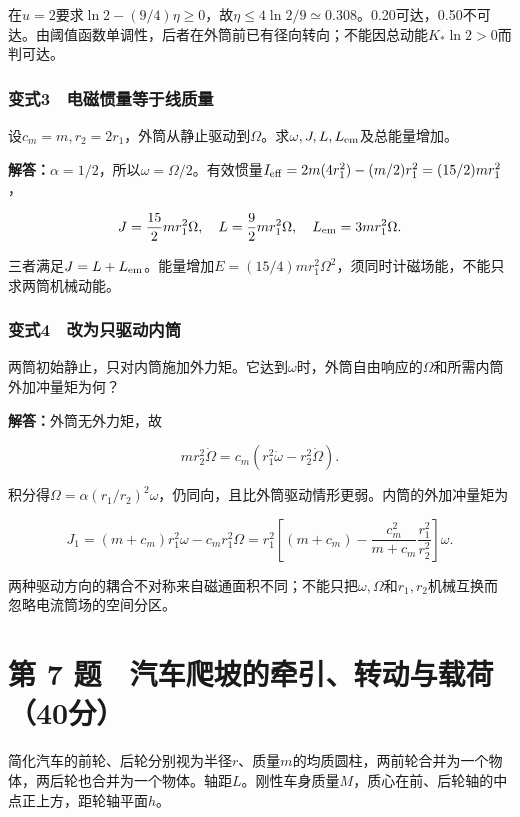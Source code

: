 \documentclass[12pt,a4paper,fontset=fandol]{ctexart}
\begin{document}
在\(u=2\)要求\(\ln2-(9/4)\eta\geq0\)，故\(\eta\leq4\ln2/9\simeq0.308\)。0.20可达，0.50不可达。由阈值函数单调性，后者在外筒前已有径向转向；不能因总动能\(K_*\ln2>0\)而判可达。

\subsubsection{变式3　电磁惯量等于线质量}\label{ux53d8ux5f0f3-ux7535ux78c1ux60efux91cfux7b49ux4e8eux7ebfux8d28ux91cf}

设\(c_m=m,r_2=2r_1\)，外筒从静止驱动到\(\Omega\)。求\(\omega,J,L,L_{\rm em}\)及总能量增加。

\textbf{解答：}\(\alpha=1/2\)，所以\(\omega=\Omega/2\)。有效惯量\(I_{\rm eff}=2m(4r_1^2)-(m/2)r_1^2=(15/2)m r_1^2\)，

\[
J=\frac{15}{2}mr_1^2\Omega,\quad
L=\frac92mr_1^2\Omega,\quad
L_{\rm em}=3mr_1^2\Omega.
\]

三者满足\(J=L+L_{\rm em}\)。能量增加\(E=(15/4)m r_1^2\Omega^2\)，须同时计磁场能，不能只求两筒机械动能。

\subsubsection{变式4　改为只驱动内筒}\label{ux53d8ux5f0f4-ux6539ux4e3aux53eaux9a71ux52a8ux5185ux7b52}

两筒初始静止，只对内筒施加外力矩。它达到\(\omega\)时，外筒自由响应的\(\Omega\)和所需内筒外加冲量矩为何？

\textbf{解答：}外筒无外力矩，故

\[
m r_2^2\dot\Omega
=c_m(r_1^2\dot\omega-r_2^2\dot\Omega).
\]

积分得\(\Omega=\alpha(r_1/r_2)^2\omega\)，仍同向，且比外筒驱动情形更弱。内筒的外加冲量矩为

\[
J_1=(m+c_m)r_1^2\omega-c_mr_1^2\Omega
=r_1^2\left[(m+c_m)-\frac{c_m^2}{m+c_m}
\frac{r_1^2}{r_2^2}\right]\omega.
\]

两种驱动方向的耦合不对称来自磁通面积不同；不能只把\(\omega,\Omega\)和\(r_1,r_2\)机械互换而忽略电流筒场的空间分区。

\clearpage

\section{第 7
题　汽车爬坡的牵引、转动与载荷（40分）}\label{ux7b2c-7-ux9898-ux6c7dux8f66ux722cux5761ux7684ux7275ux5f15ux8f6cux52a8ux4e0eux8f7dux837740ux5206}

简化汽车的前轮、后轮分别视为半径\(r\)、质量\(m\)的均质圆柱，两前轮合并为一个物体，两后轮也合并为一个物体。轴距\(L\)。刚性车身质量\(M\)，质心在前、后轮轴的中点正上方，距轮轴平面\(h\)。
\end{document}
